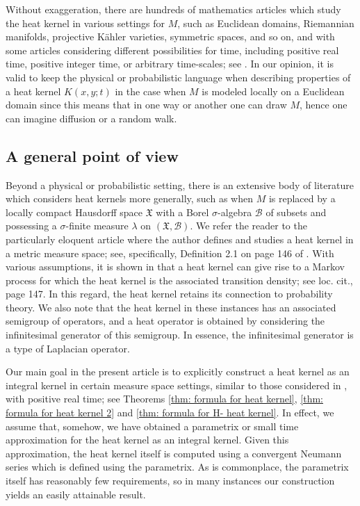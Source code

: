 \documentclass[11pt,reqno]{amsart}
\theoremstyle{remark}
\theoremstyle{definition}
\numberwithin{theorem}{section} \numberwithin{equation}{section}
\newcommand{\X}{\mathfrak{X}}
\begin{document}
Without exaggeration, there
are hundreds of mathematics articles which study the heat kernel in various settings for $M$, such as Euclidean domains,
Riemannian manifolds, projective K\"ahler varieties, symmetric spaces, and so on, and with some articles considering different possibilities
for time, including positive real time, positive integer time, or arbitrary time-scales; see \cite{BP01}.   In our opinion, it is valid to
keep the physical or probabilistic language when describing properties of a heat kernel $K(x,y;t)$ in the case when $M$
is modeled locally on a Euclidean domain since this means that in one way or another one can draw $M$, hence one can imagine diffusion or a random walk.

\subsection{A general point of view}
Beyond a physical or probabilistic setting, there is an extensive body of literature which considers heat kernels more generally,
such as when $M$ is replaced by  a locally compact Hausdorff space $\mathfrak{X}$ with a Borel $\sigma$-algebra  $\mathcal{B}$  of subsets
and possessing a $\sigma$-finite measure $\lambda$ on $(\X,\mathcal{B})$.
We refer the reader to the particularly eloquent article
\cite{Gr03} where the author defines and studies a heat kernel in a metric measure space;  see, specifically, Definition 2.1 on page 146 of \cite{Gr03}.
With various assumptions, it is shown in \cite{Gr03} that a heat kernel can give rise to a Markov process for which the heat kernel is
the associated transition density; see  loc. cit., page 147.
  In this regard, the heat kernel retains its connection to probability theory.
We also note that the heat kernel in these instances has an associated
semigroup of operators, and a heat operator is obtained by considering the infinitesimal generator of
this semigroup.   In essence, the infinitesimal generator is a type of Laplacian operator.

Our main goal in the present article is to explicitly construct a heat kernel as an integral kernel
in certain measure space settings, similar to those considered in \cite{Gr03}, with positive real time;
see Theorems \ref{thm: formula for heat kernel}, \ref{thm: formula for heat kernel 2} and
 \ref{thm: formula for H- heat kernel}.
  In effect,
we assume that, somehow, we have obtained a parametrix or small time approximation for the heat kernel
as an integral kernel.  Given this approximation, the heat kernel
itself is computed using a convergent Neumann series which is defined using the parametrix.  As is commonplace, the
parametrix itself has reasonably few requirements, so in many instances our construction yields an easily attainable result.
\end{document}
